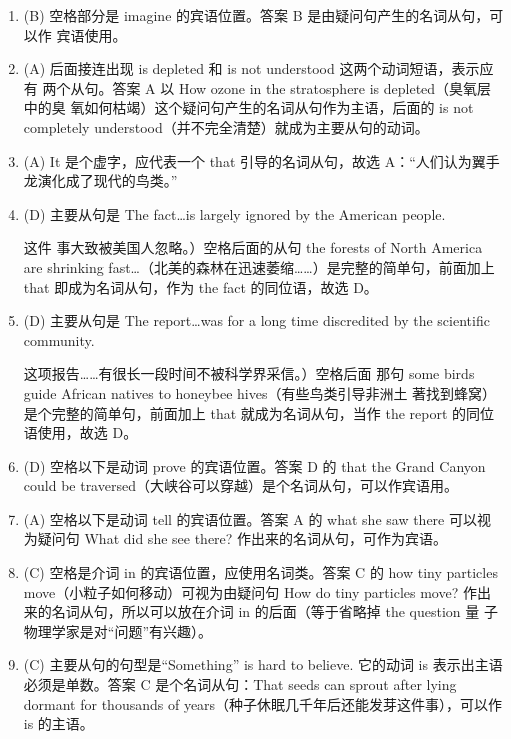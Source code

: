 \begin{enumerate}
\item (B) 空格部分是 imagine 的宾语位置。答案 B 是由疑问句产生的名词从句，可以作
  宾语使用。

\item (A) 后面接连出现 is depleted 和 is not understood 这两个动词短语，表示应有
  两个从句。答案 A 以 How ozone in the stratosphere is depleted（臭氧层中的臭
  氧如何枯竭）这个疑问句产生的名词从句作为主语，后面的 is not completely
  understood（并不完全清楚）就成为主要从句的动词。
\item (A) It 是个虚字，应代表一个 that 引导的名词从句，故选 A：“人们认为翼手龙演化成了现代的鸟类。”

\item (D) 主要从句是 The fact…is largely ignored by the American people.

这件
  事大致被美国人忽略。）空格后面的从句 the forests of North America are
  shrinking fast…（北美的森林在迅速萎缩……）是完整的简单句，前面加上 that
  即成为名词从句，作为 the fact 的同位语，故选 D。


\item (D) 主要从句是 The report…was for a long time discredited by the
  scientific community.

这项报告……有很长一段时间不被科学界采信。）空格后面
  那句 some birds guide African natives to honeybee hives（有些鸟类引导非洲土
  著找到蜂窝）是个完整的简单句，前面加上 that 就成为名词从句，当作 the
  report 的同位语使用，故选 D。

\item (D) 空格以下是动词 prove 的宾语位置。答案 D 的 that the Grand Canyon could be traversed（大峡谷可以穿越）是个名词从句，可以作宾语用。


\item  (A) 空格以下是动词 tell 的宾语位置。答案 A 的 what she saw there 可以视为疑问句 What did she see there? 作出来的名词从句，可作为宾语。


\item (C) 空格是介词 in 的宾语位置，应使用名词类。答案 C 的 how tiny
  particles move（小粒子如何移动）可视为由疑问句 How do tiny particles move?
  作出来的名词从句，所以可以放在介词 in 的后面（等于省略掉 the question 量
  子物理学家是对“问题”有兴趣）。


\item  (C) 主要从句的句型是“Something” is hard to believe. 它的动词 is 表示出主语必须是单数。答案 C 是个名词从句：That seeds can sprout after lying dormant for thousands of years（种子休眠几千年后还能发芽这件事），可以作 is 的主语。


\end{enumerate}
